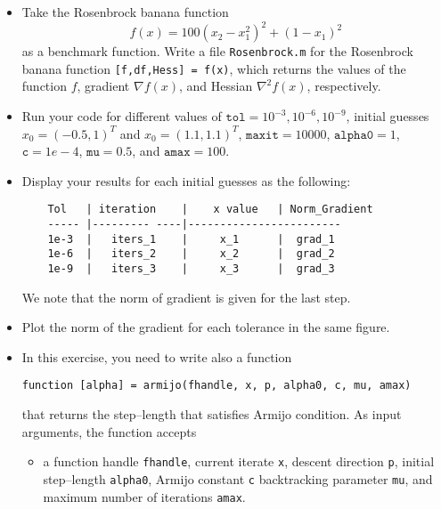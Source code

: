 \documentclass[a4paper,11pt]{article}
\begin{document}
\begin{enumerate}
        \begin{itemize}
           \item  Take the Rosenbrock banana function
                    \[
                     f(x) = 100(x_2-x_1^2)^2 + (1-x_1)^2
                    \]
                    as a benchmark function. Write a file \texttt{Rosenbrock.m} for the Rosenbrock banana function \texttt{[f,df,Hess] = f(x)}, which returns the values of the function $f$, gradient $\nabla f(x)$, and Hessian $\nabla^2 f(x)$, respectively.
            \item Run your  code for different values of  $ \texttt{tol} = 10^{-3}, 10^{-6}, 10^{-9} $, initial guesses $ x_0=(-0.5,1)^T $ and $ x_0=(1.1,1.1)^T $, $\texttt{maxit}=10000$, $\texttt{alpha0}=1$,$\texttt{c}=1e-4 $, $\texttt{mu}=0.5 $, and $\texttt{amax}=100$.
		    \item Display your results for each initial guesses as the following:
\begin{verbatim}
	Tol   | iteration    |    x value   | Norm_Gradient
	----- |--------- ----|------------------------
	1e-3  |   iters_1    |     x_1      |  grad_1
	1e-6  |   iters_2    |     x_2      |  grad_2
	1e-9  |   iters_3    |     x_3      |  grad_3
\end{verbatim}
        We note that the norm of gradient is given for the last step.
		\item Plot the norm of the gradient for each tolerance in the same figure.
        \item In this exercise, you need to write also a function
		\begin{center}
			\texttt{function [alpha] = armijo(fhandle, x, p, alpha0, c, mu, amax)}
		\end{center}
		that returns the step--length that satisfies Armijo condition. As input arguments, the function accepts
		\begin{itemize}
			\item a function handle \texttt{fhandle}, current iterate \texttt{x}, descent direction \texttt{p}, initial step--length \texttt{alpha0}, Armijo constant \texttt{c} backtracking
            parameter \texttt{mu},   and maximum number of iterations \texttt{amax}.
		\end{itemize}
        \end{itemize}
\end{enumerate}
\end{document}
